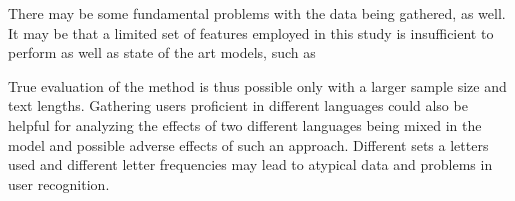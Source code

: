 There may be some fundamental problems with the data being gathered, as well. It may be that a limited set of features employed in this study is insufficient to perform as well as state of the art models, such as 

True evaluation of the method is thus possible only with a larger sample size and text lengths. Gathering users proficient in different languages could also be helpful for analyzing the effects of two different languages being mixed in the model and possible adverse effects of such an approach. Different sets a letters used and different letter frequencies may lead to atypical data and problems in user recognition.
